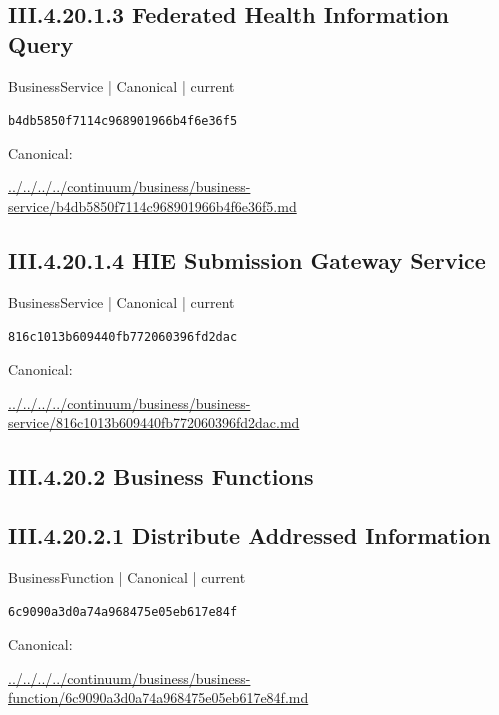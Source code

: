 \documentclass[10pt,a4paper]{article}
\begin{document}
\subsection*{III.4.20.1.3 Federated Health Information Query}
{\small BusinessService | Canonical | current}\par
\texttt{b4db5850f7114c968901966b4f6e36f5}\par
Canonical: \par
{\footnotesize\url{../../../../continuum/business/business-service/b4db5850f7114c968901966b4f6e36f5.md}}\par
\subsection*{III.4.20.1.4 HIE Submission Gateway Service}
{\small BusinessService | Canonical | current}\par
\texttt{816c1013b609440fb772060396fd2dac}\par
Canonical: \par
{\footnotesize\url{../../../../continuum/business/business-service/816c1013b609440fb772060396fd2dac.md}}\par
\subsection*{III.4.20.2 Business Functions}
\subsection*{III.4.20.2.1 Distribute Addressed Information}
{\small BusinessFunction | Canonical | current}\par
\texttt{6c9090a3d0a74a968475e05eb617e84f}\par
Canonical: \par
{\footnotesize\url{../../../../continuum/business/business-function/6c9090a3d0a74a968475e05eb617e84f.md}}\par
\end{document}
